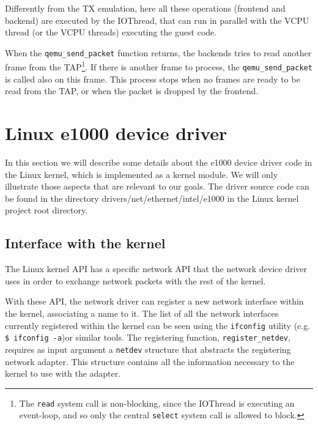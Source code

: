 Differently from the TX emulation, here all these operations (frontend and backend) are executed by the IOThread, that can run in parallel
with the VCPU thread (or the VCPU threads) executing the guest code.

\vspace{0.5cm}

When the \texttt{qemu\_send\_packet} function returns, the backends tries to read another frame from the TAP\footnote{The \texttt{read}
system call is non-blocking, since the IOThread is executing an event-loop, and so only the central \texttt{select} system call is
allowed to block.}. If there is another frame to process, the \texttt{qemu\_send\_packet} is called also on this frame.
This process stops when no frames are ready to be read from the TAP, or when the packet is dropped by the frontend.



\section{Linux e1000 device driver}
In this section we will describe some details about the e1000 device driver code in the Linux kernel, which is implemented as
a kernel module.
We will only illustrate those aspects that are relevant to our goals.
The driver source code can be found in the directory drivers/net/ethernet/intel/e1000 in the Linux kernel project root directory.

\subsection{Interface with the kernel}
\label{sec:netapi}
The Linux kernel API has a specific network API that the network device driver uses in order to exchange network packets with
the rest of the kernel.

With these API, the network driver can register a new network interface within the kernel, associating a name to it.
The list of all the network interfaces currently registered within the kernel can be seen using the \texttt{ifconfig} utility
(e.g. \texttt{\$ ifconfig -a})or similar tools.
The registering function, \texttt{register\_netdev}, requires as input argument a \texttt{netdev} structure that abstracts the
registering network adapter. This structure contains all the information necessary to the kernel to use with the adapter.

